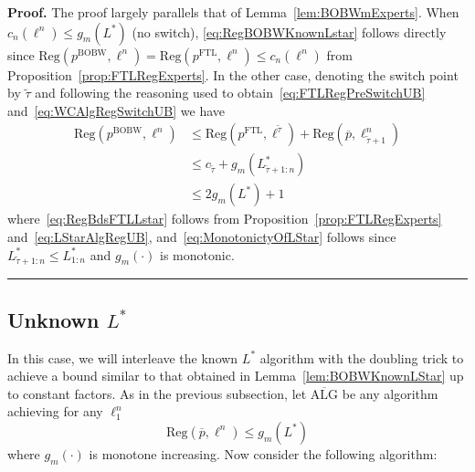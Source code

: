 \documentclass[11pt,letter]{article}
\newenvironment{proof}[1][Proof]{\noindent\textbf{#1.} }{\ \rule{0.5em}{0.5em}}
\newcommand{\Reg}{\mathrm{Reg}}
\newcommand{\pftl}{p^{\mathrm{FTL}}}
\newcommand{\pwc}{\overline{p}}
\newcommand{\wcalg}{\overline{\text{ALG}}}
\newcommand{\pbobw}{p^{\mathrm{BOBW}}}
\newcommand{\ttil}{\widetilde{\tau}}
\begin{document}
\begin{proof}
    The proof largely parallels that of Lemma~\ref{lem:BOBWmExperts}. When $c_n(\ell^n) \le g_m(L^*)$ (no switch), \eqref{eq:RegBOBWKnownLstar} follows directly since $\Reg(\pbobw, \ell^n) = \Reg(\pftl, \ell^n) \le c_n(\ell^n)$ from Proposition~\ref{prop:FTLRegExperts}. In the other case, denoting the switch point by $\ttil$ and following the reasoning used to obtain~\eqref{eq:FTLRegPreSwitchUB} and~\eqref{eq:WCAlgRegSwitchUB} we have 
    \begin{align}
        \Reg(\pbobw,\ell^n) &\le \Reg(\pftl, \ell^{\ttil}) + \Reg(\pwc, \ell_{\ttil+1}^n) \nonumber\\
        &\le c_{\ttil} + g_m(L^*_{\ttil+1:n}) \label{eq:RegBdsFTLLstar}\\
        &\le 2g_m(L^*)+1 \label{eq:MonotonictyOfLStar}
    \end{align} 
    where~\eqref{eq:RegBdsFTLLstar} follows from Proposition~\ref{prop:FTLRegExperts} and~\eqref{eq:LStarAlgRegUB}, and~\eqref{eq:MonotonictyOfLStar} follows since $L^*_{\ttil+1:n} \le L^*_{1:n}$ and $g_m(\cdot)$ is monotonic.
\end{proof}
\subsection{Unknown $L^*$}
In this case, we will interleave the known $L^*$ algorithm with the doubling trick to achieve a bound similar to that obtained in Lemma~\ref{lem:BOBWKnownLStar} up to constant factors. As in the previous subsection, let $\wcalg$ be any algorithm achieving for any $\ell_1^n$
\[
\Reg(\pwc, \ell^n) \le g_m(L^*)
\]
where $g_m(\cdot)$ is monotone increasing. Now consider the following algorithm: 
\end{document}
